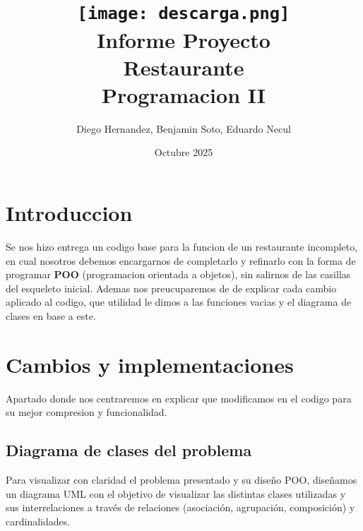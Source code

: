 \documentclass[a4paper,12pt]{article}
\title {\texttt{[image: descarga.png]}\\[2ex]{\textbf{Informe Proyecto\\ Restaurante}\\[1.5ex] Programacion II\\[20ex]}}
\author{Diego Hernandez, Benjamin Soto, Eduardo Necul}
\date{Octubre 2025}
\begin{document}
\maketitle

\newpage
\tableofcontents
\newpage

\section{Introduccion}

Se nos hizo entrega un codigo base para la funcion de un restaurante incompleto, en cual nosotros debemos encargarnos de completarlo y refinarlo con la forma de programar \textbf{POO} (programacion orientada a objetos), sin salirnos de las casillas del esqueleto inicial. Ademas nos preucuparemos de de explicar cada cambio aplicado al codigo, que utilidad le dimos a las funciones vacias y el diagrama de clases en base a este.

\section{Cambios y implementaciones}

Apartado donde nos centraremos en explicar que modificamos en el codigo para su mejor compresion y funcionalidad.

\subsection{Diagrama de clases del problema}

Para visualizar con claridad el problema presentado y su diseño POO, diseñamos un diagrama UML con el objetivo de visualizar las distintas clases utilizadas y sus interrelaciones a través de relaciones (asociación, agrupación, composición) y cardinalidades.
\end{document}

